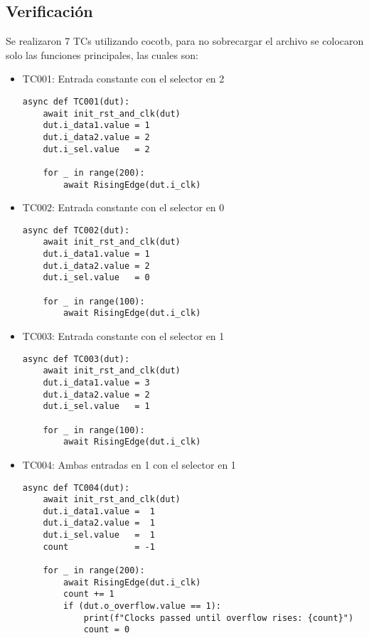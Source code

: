 \subsection{Verificación}
Se realizaron 7 TCs utilizando cocotb, para no sobrecargar el archivo se colocaron solo las funciones principales, las cuales son:
\begin{itemize}
    \item TC001: Entrada constante con el selector en 2
        \begin{verbatim}
async def TC001(dut):
    await init_rst_and_clk(dut)
    dut.i_data1.value = 1
    dut.i_data2.value = 2 
    dut.i_sel.value   = 2

    for _ in range(200):
        await RisingEdge(dut.i_clk)
        \end{verbatim}

    \item TC002: Entrada constante con el selector en 0
        \begin{verbatim}
async def TC002(dut):
    await init_rst_and_clk(dut)
    dut.i_data1.value = 1
    dut.i_data2.value = 2 
    dut.i_sel.value   = 0

    for _ in range(100):
        await RisingEdge(dut.i_clk)
        \end{verbatim}

    \item TC003: Entrada constante con el selector en 1
        \begin{verbatim}
async def TC003(dut):
    await init_rst_and_clk(dut)
    dut.i_data1.value = 3
    dut.i_data2.value = 2 
    dut.i_sel.value   = 1

    for _ in range(100):
        await RisingEdge(dut.i_clk)
        \end{verbatim}

    \item TC004: Ambas entradas en 1 con el selector en 1
        \begin{verbatim}
async def TC004(dut):
    await init_rst_and_clk(dut)
    dut.i_data1.value =  1
    dut.i_data2.value =  1 
    dut.i_sel.value   =  1
    count             = -1

    for _ in range(200):
        await RisingEdge(dut.i_clk)
        count += 1
        if (dut.o_overflow.value == 1):
            print(f"Clocks passed until overflow rises: {count}")
            count = 0
        \end{verbatim}


\end{itemize}

